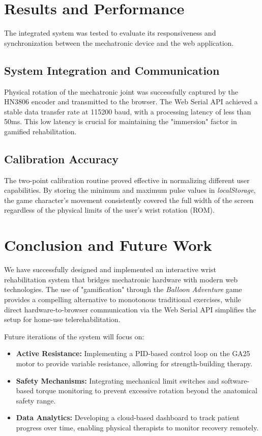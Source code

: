 \documentclass[conference]{IEEEtran}
\begin{document}
  \section{Results and Performance}

  The integrated system was tested to evaluate its responsiveness and synchronization between the mechatronic device and the web application.

  \subsection{System Integration and Communication}
  Physical rotation of the mechatronic joint was successfully captured by the HN3806 encoder and transmitted to the browser. The Web Serial API achieved a stable data transfer rate at 115200 baud, with a processing latency of less than 50ms. This low latency is crucial for maintaining the "immersion" factor in gamified rehabilitation.

  \subsection{Calibration Accuracy}
  The two-point calibration routine proved effective in normalizing different user capabilities. By storing the minimum and maximum pulse values in \textit{localStorage}, the game character's movement consistently covered the full width of the screen regardless of the physical limits of the user's wrist rotation (ROM).

  \section{Conclusion and Future Work}

  We have successfully designed and implemented an interactive wrist rehabilitation system that bridges mechatronic hardware with modern web technologies. The use of "gamification" through the \textit{Balloon Adventure} game provides a compelling alternative to monotonous traditional exercises, while direct hardware-to-browser communication via the Web Serial API simplifies the setup for home-use telerehabilitation.

  Future iterations of the system will focus on:
  \begin{itemize}
    \item \textbf{Active Resistance:} Implementing a PID-based control loop on the GA25 motor to provide variable resistance, allowing for strength-building therapy.
    \item \textbf{Safety Mechanisms:} Integrating mechanical limit switches and software-based torque monitoring to prevent excessive rotation beyond the anatomical safety range.
    \item \textbf{Data Analytics:} Developing a cloud-based dashboard to track patient progress over time, enabling physical therapists to monitor recovery remotely.
  \end{itemize}
\end{document}
